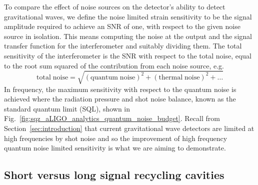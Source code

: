 \documentclass[aps,pra,superscriptaddress,reprint,nofootinbib]{revtex4-1}
\begin{document}
To compare the effect of noise sources on the detector’s ability to detect gravitational waves, we define the noise limited strain sensitivity to be the signal amplitude required to achieve an SNR of one, with respect to the given noise source in isolation. This means computing the noise at the output and the signal transfer function for the interferometer and suitably dividing them. The total sensitivity of the interferometer is the SNR with respect to the total noise, equal to the root sum squared of the contribution from each noise source, e.g.\
\begin{equation}
\mathrm{total\; noise = \sqrt{(quantum \; noise)^2 + (thermal \; noise)^2 + \ldots}}
\end{equation}
In frequency, the maximum sensitivity with respect to the quantum noise is achieved where the radiation pressure and shot noise balance, known as the standard quantum limit (SQL), shown in Fig.~\ref{fig:sqz_aLIGO_analytics_quantum_noise_budget}. Recall from Section~\ref{sec:introduction} that current gravitational wave detectors are limited at high frequencies by shot noise and so the improvement of high frequency quantum noise limited sensitivity is what we are aiming to demonstrate.


\subsection{Short versus long signal recycling cavities}
\label{sec:long_srcs}
\end{document}
